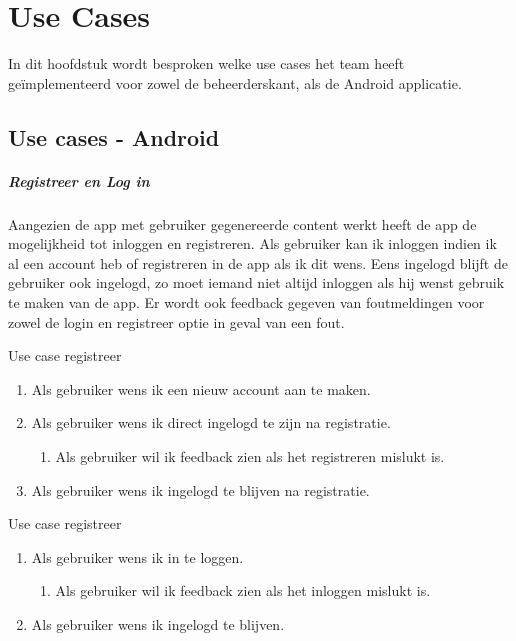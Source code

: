 \chapter{Use Cases}
\label{Use Cases}

In dit hoofdstuk wordt besproken welke use cases het team heeft geïmplementeerd voor zowel de beheerderskant, als de Android applicatie.

\section{Use cases - Android}

\paragraph{Registreer en Log in}
Aangezien de app met gebruiker gegenereerde content werkt heeft de app de mogelijkheid tot inloggen en registreren. Als gebruiker kan ik inloggen indien ik al een account heb of registreren in de app als ik dit wens. Eens ingelogd blijft de gebruiker ook ingelogd, zo moet iemand niet altijd inloggen als hij wenst gebruik te maken van de app. Er wordt ook feedback gegeven van foutmeldingen voor zowel de login en registreer optie in geval van een fout.

Use case registreer
\begin{enumerate}
	\item Als gebruiker wens ik een nieuw account aan te maken.
	\item Als gebruiker wens ik direct ingelogd te zijn na registratie.
		\begin{enumerate}
		\item Als gebruiker wil ik feedback zien als het registreren mislukt is.
	\end{enumerate}
	\item Als gebruiker wens ik ingelogd te blijven na registratie.
\end{enumerate}


Use case registreer
\begin{enumerate}
	\item Als gebruiker wens ik in te loggen.
	\begin{enumerate}
		\item Als gebruiker wil ik feedback zien als het inloggen mislukt is.
	\end{enumerate}
	\item Als gebruiker wens ik ingelogd te blijven.
\end{enumerate}

